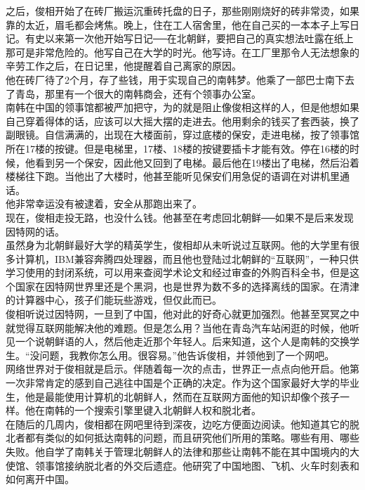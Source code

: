 之后，俊相开始了在砖厂搬运沉重砖托盘的日子，那些刚刚烧好的砖非常烫，如果靠的太近，眉毛都会烤焦。晚上，住在工人宿舍里，他在自己买的一本本子上写日记。有史以来第一次他开始写日记──在北朝鲜，要把自己的真实想法吐露在纸上那可是非常危险的。他写自己在大学的时光。他写诗。在工厂里那令人无法想象的辛劳工作之后，在日记里，他提醒着自己离家的原因。\\

他在砖厂待了2个月，存了些钱，用于实现自己的南韩梦。他乘了一部巴士南下去了青岛，那里有一个很大的南韩商会，还有个领事办公室。\\

南韩在中国的领事馆都被严加把守，为的就是阻止像俊相这样的人，但是他想如果自己穿着得体的话，应该可以大摇大摆的走进去。他用剩余的钱买了套西装，换了副眼镜。自信满满的，出现在大楼面前，穿过底楼的保安，走进电梯，按了领事馆所在17楼的按键。但是电梯里，17楼、18楼的按键要插卡才能有效。停在16楼的时候，他看到另一个保安，因此他又回到了电梯。最后他在19楼出了电梯，然后沿着楼梯往下跑。当他出了大楼时，他甚至能听见保安们用急促的语调在对讲机里通话。\\

他非常幸运没有被逮着，安全从那跑出来了。\\

现在，俊相走投无路，也没什么钱。他甚至在考虑回北朝鲜──如果不是后来发现因特网的话。\\

虽然身为北朝鲜最好大学的精英学生，俊相却从未听说过互联网。他的大学里有很多计算机，IBM兼容奔腾四处理器，而且他也登陆过北朝鲜的“互联网”，一种只供学习使用的封闭系统，可以用来查阅学术论文和经过审查的外购百科全书，但是这个国家在因特网世界里还是个黑洞，也是世界为数不多的选择离线的国家。在清津的计算器中心，孩子们能玩些游戏，但仅此而已。\\

俊相听说过因特网，一旦到了中国，他对此的好奇心就更加强烈。他甚至冥冥之中就觉得互联网能解决他的难题。但是怎么用？当他在青岛汽车站闲逛的时候，他听见一个说朝鲜语的人，然后他走近那个年轻人。后来知道，这个人是南韩的交换学生。“没问题，我教你怎么用。很容易。”他告诉俊相，并领他到了一个网吧。\\

网络世界对于俊相就是启示。伴随着每一次的点击，世界正一点点向他开启。他第一次非常肯定的感到自己逃往中国是个正确的决定。作为这个国家最好大学的毕业生，他是最能使用计算机的北朝鲜人，然而在互联网方面他的知识却像个孩子一样。他在南韩的一个搜索引擎里键入北朝鲜人权和脱北者。\\

在随后的几周内，俊相都在网吧里待到深夜，边吃方便面边阅读。他知道其它的脱北者都有类似的如何抵达南韩的问题，而且研究他们所用的策略。哪些有用、哪些失败。他自学了南韩关于管理北朝鲜人的法律和那些让南韩不能在其中国境内的大使馆、领事馆接纳脱北者的外交后遗症。他研究了中国地图、飞机、火车时刻表和如何离开中国。\\

